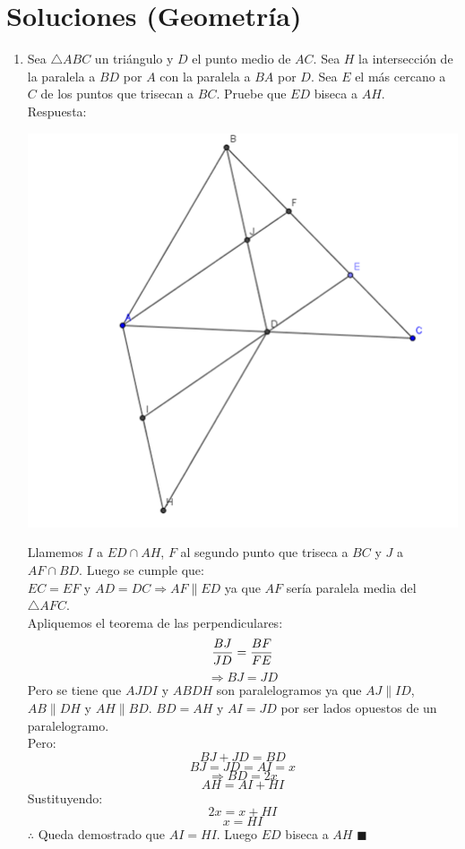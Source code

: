 \documentclass{book}
\begin{document}
		\section{Soluciones (Geometría)}
			\begin{enumerate}
				\item Sea $\triangle ABC$ un triángulo y $D$ el punto medio de $AC$. Sea $H$ la intersección de la paralela a $BD$ por $A$ con la paralela a $BA$ por $D$. Sea $E$ el más cercano a $C$ de los puntos que trisecan a $BC$. Pruebe que $ED$ biseca a $AH$.\\
					Respuesta:
					\begin{center}
						\includegraphics[scale=1]{imagenes/Geometria/1.png}
					\end{center}
					Llamemos $I$ a $ED\cap AH$, $F$ al segundo punto que triseca a $BC$ y $J$ a $AF\cap BD$. Luego se cumple que:\\
$EC=EF$ y $AD=DC\Rightarrow AF\parallel ED$ ya que $AF$ sería paralela media del $\triangle AFC$.\\
Apliquemos el teorema de las perpendiculares:
$${BJ\over JD}={BF\over FE}$$
$$\Rightarrow BJ=JD$$
Pero se tiene que $AJDI$ y $ABDH$ son paralelogramos ya que $AJ\parallel ID$, $AB\parallel DH$ y $AH\parallel BD$.
$BD=AH$ y $AI=JD$ por ser lados opuestos de un paralelogramo.\\
Pero:
$$BJ+JD=BD$$
$$BJ=JD=AI=x$$
$$\Rightarrow BD=2x$$
$$AH=AI+HI$$
Sustituyendo:
$$2x=x+HI$$
$$x=HI$$
$\therefore$ Queda demostrado que $AI=HI$. Luego $ED$ biseca a $AH$ $\blacksquare$\\

\end{enumerate}
\end{document}
